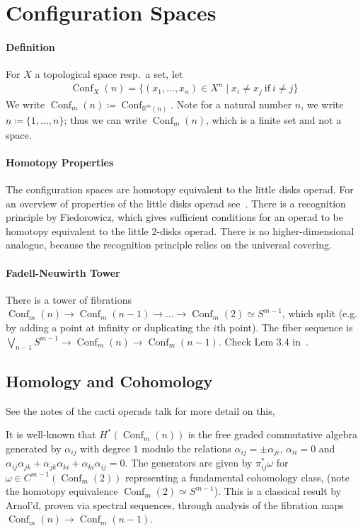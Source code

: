 \documentclass{scrartcl}
\theoremstyle{plain}
\theoremstyle{definition}
\newcommand{\R}{\mathbb R}
\newcommand{\defeq}{\coloneqq}
\DeclareMathOperator{\Conf}{Conf}
\begin{document}
\section{Configuration Spaces}

\paragraph{Definition} For $X$ a topological space resp.\ a set, let
\begin{align*}
    \Conf_X(n) = \{(x_1,\dots, x_n)\in X^n \mid x_i \neq x_j\ \text{if}\ i\neq j\}
\end{align*}
We write $\Conf_m(n) \coloneqq \Conf_{\R^m(n)}$. Note for a natural number $n$, we write $\underline n \defeq \{1, \dots, n\}$; thus we can write $\Conf_{\underline m}(n)$, which is a finite set and not a space. 

\paragraph{Homotopy Properties} The configuration spaces are homotopy equivalent to the little disks operad. For an overview of properties of the little disks operad see~\cite{fresse2017homotopy}. There is a recognition principle by Fiedorowicz, which gives sufficient conditions for an operad to be homotopy equivalent to the little 2-disks operad. There is no higher-dimensional analogue, because the recognition principle relies on the universal covering. 

\paragraph{Fadell-Neuwirth Tower} There is a tower of fibrations $\Conf_m(n) \to \Conf_m(n-1) \to \dots \to \Conf_m(2) \simeq S^{m-1}$, which split (e.g. by adding a point at infinity or duplicating the $i$th point). The fiber sequence is $\bigvee_{n-1} S^{m-1} \to \Conf_m(n) \to \Conf_m(n-1)$. Check Lem 3.4 in~\cite{sinha2010homology}. 

\subsection{Homology and Cohomology} 
See the notes of the cacti operads talk for more detail on this, 

It is well-known that $H^*(\Conf_m(n))$ is the free graded commutative algebra generated by $\alpha_{ij}$ with degree $1$ modulo the relations $\alpha_{ij} = \pm\alpha_{ji}$, $\alpha_{ii}=0$ and $\alpha_{ij}\alpha_{jk} + \alpha_{jk}\alpha_{ki} + \alpha_{ki}\alpha_{ij} = 0$. The generators are given by $\pi_{ij}^*\omega$ for $\omega\in C^{m-1}(\Conf_m(2))$ representing a fundamental cohomology class, (note the homotopy equivalence $\Conf_m(2)\simeq S^{m-1}$). This is a classical result by Arnol'd, proven via spectral sequences, through analysis of the fibration maps $\Conf_m(n) \to \Conf_m(n-1)$. 
\end{document}
